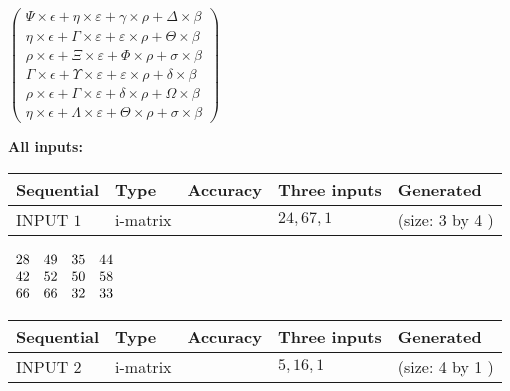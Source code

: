 \documentclass[12pt]{article}
\begin{document}
   
 $  \left( \begin{array}
 {
 c
 }
  \Psi \times  \epsilon +  \eta \times  \varepsilon +  \gamma \times  \rho +  \Delta \times  \beta \\ 
  \eta \times  \epsilon +  \Gamma \times  \varepsilon +  \varepsilon \times  \rho +  \Theta \times  \beta \\ 
  \rho \times  \epsilon +                     \Xi \times  \varepsilon +  \Phi \times  \rho +  \sigma \times  \beta \\ 
  \Gamma \times  \epsilon +  \Upsilon \times  \varepsilon +  \varepsilon \times  \rho +  \delta \times  \beta \\ 
  \rho \times  \epsilon +  \Gamma \times  \varepsilon +  \delta \times  \rho +  \Omega \times  \beta \\ 
  \eta \times  \epsilon +  \Lambda \times  \varepsilon +  \Theta \times  \rho +  \sigma \times  \beta
 \end{array} \right) $ 
   
   
\noindent\vspace{0.1in}\hspace{-0.08in} {\textbf{\Large{All inputs: }}}
   
   
  
  
\noindent\begin{tabular}{|l|l|l|l|l|}
\hline
 Sequential & Type & Accuracy & Three inputs & Generated \\ 
\hline
 
 
  INPUT $            1 $ & i-matrix &  & $
 24
 , 
 67
 , 
 1
 $ & (size:            3  by            4 )
 \\  \hline  
 \end{tabular}
   
   
 $\begin{array}{
 c
 c
 c
 c
 }
          28  & 
          49  & 
          35  & 
          44  \\ 
          42  & 
          52  & 
          50  & 
          58  \\ 
          66  & 
          66  & 
          32  & 
          33
\end{array}  $ 
  
  
\noindent\begin{tabular}{|l|l|l|l|l|}
\hline
 Sequential & Type & Accuracy & Three inputs & Generated \\ 
\hline
 
 
  INPUT $            2 $ & i-matrix &  & $
 5
 , 
 16
 , 
 1
 $ & (size:            4  by            1 )
 \\  \hline  
 \end{tabular}
   
\end{document}

